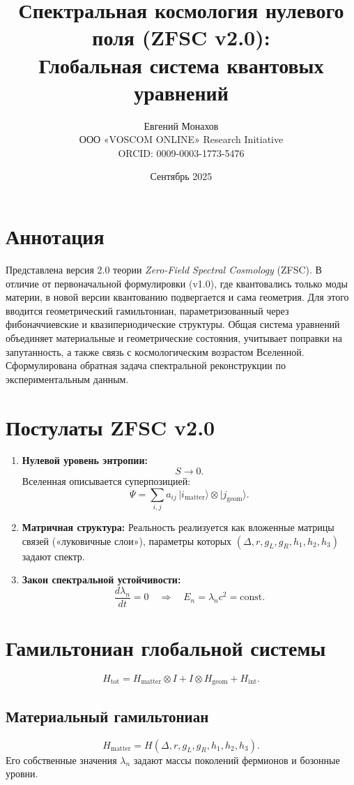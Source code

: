 \documentclass[12pt,a4paper]{article}
\title{Спектральная космология нулевого поля (ZFSC v2.0): \\ Глобальная система квантовых уравнений}
\author{Евгений Монахов \\ ООО «VOSCOM ONLINE» Research Initiative \\ ORCID: 0009-0003-1773-5476}
\date{Сентябрь 2025}
\begin{document}
\maketitle

\section*{Аннотация}
Представлена версия 2.0 теории \emph{Zero-Field Spectral Cosmology} (ZFSC). В отличие от первоначальной формулировки (v1.0), где квантовались только моды материи, в новой версии квантованию подвергается и сама геометрия. Для этого вводится геометрический гамильтониан, параметризованный через фибоначчиевские и квазипериодические структуры. Общая система уравнений объединяет материальные и геометрические состояния, учитывает поправки на запутанность, а также связь с космологическим возрастом Вселенной. Сформулирована обратная задача спектральной реконструкции по экспериментальным данным.

\section{Постулаты ZFSC v2.0}
\begin{enumerate}
    \item \textbf{Нулевой уровень энтропии:}
    \[
    S \to 0.
    \]
    Вселенная описывается суперпозицией:
    \[
    \Psi = \sum_{i,j} a_{ij}\, |i_{\text{matter}}\rangle \otimes |j_{\text{geom}}\rangle .
    \]

    \item \textbf{Матричная структура:}  
    Реальность реализуется как вложенные матрицы связей («луковичные слои»), параметры которых $(\Delta, r, g_L, g_R, h_1,h_2,h_3)$ задают спектр.

    \item \textbf{Закон спектральной устойчивости:}
    \[
    \frac{d \lambda_n}{dt} = 0 \quad \Rightarrow \quad E_n = \lambda_n c^2 = \mathrm{const}.
    \]
\end{enumerate}

\section{Гамильтониан глобальной системы}
\[
H_{\mathrm{tot}} = H_{\mathrm{matter}} \otimes I + I \otimes H_{\mathrm{geom}} + H_{\mathrm{int}}.
\]

\subsection{Материальный гамильтониан}
\[
H_{\mathrm{matter}} = H(\Delta, r, g_L, g_R, h_1, h_2, h_3).
\]
Его собственные значения $\lambda_n$ задают массы поколений фермионов и бозонные уровни.
\end{document}
